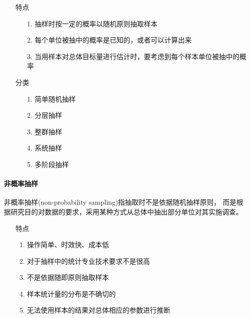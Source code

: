 \documentclass[UTF8,10pt]{book}
\begin{document}
            \begin{itemize}
                \item [特点] {
                    \begin{enumerate}
                        \item [1.] 抽样时按一定的概率以随机原则抽取样本
                        \item [2.] 每个单位被抽中的概率是已知的，或者可以计算出来
                        \item [3.] 当用样本对总体目标量进行估计时，要考虑到每个样本单位被抽中的概率
                                        
                    \end{enumerate}
                }
            \end{itemize}

            \begin{itemize}
                \item [分类] {
                    \begin{enumerate}
                        \item [1.] 简单随机抽样
                        \item [2.] 分层抽样
                        \item [3.] 整群抽样
                        \item [4.] 系统抽样
                        \item [5.] 多阶段抽样                                    
                    \end{enumerate}
                }
            \end{itemize}

        \paragraph{非概率抽样}
            非概率抽样(non-probability sampling)指抽取时不是依据随机抽样原则，
            而是根据研究目的对数据的要求，采用某种方式从总体中抽出部分单位对其实施调查。
            \begin{itemize}
                \item [特点] {
                    \begin{enumerate}
                        \item 操作简单、时效快、成本低
                        \item 对于抽样中的统计专业技术要求不是很高
                        \item 不是依据随即原则抽取样本
                        \item 样本统计量的分布是不确切的
                        \item 无法使用样本的结果对总体相应的参数进行推断
                                        
                    \end{enumerate}
                }
            \end{itemize}
\end{document}
